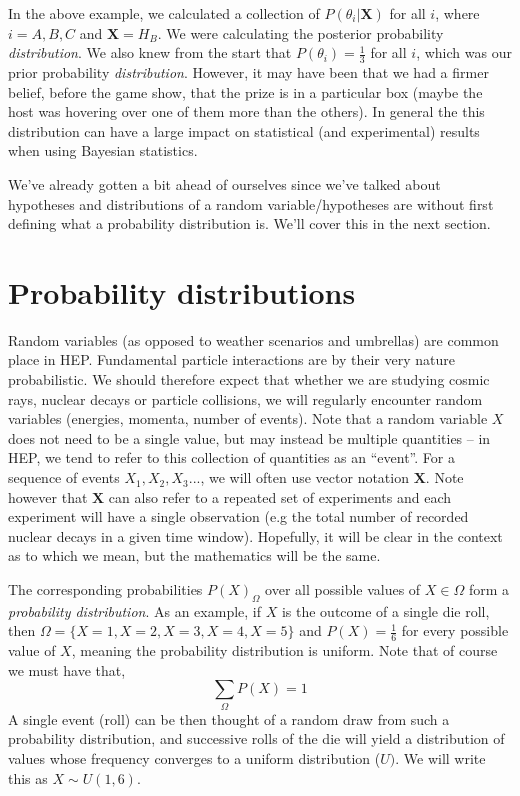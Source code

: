 In the above example, we calculated a collection of $P(\theta_i|\mathbf{X})$ for all $i$, where $i=A, B, C$ and $\mathbf{X}=H_{B}$. We were calculating the posterior probability \emph{distribution}. We also knew from the start that $P(\theta_i)=\frac{1}{3}$ for all $i$, which was  our prior probability \emph{distribution}. However, it may have been that we had a firmer belief, before the game show, that the prize is in a particular box (maybe the host was hovering over one of them more than the others). In general the this distribution can have a large impact on statistical (and experimental) results when using Bayesian statistics. 

We've already gotten a bit ahead of ourselves since we've talked about hypotheses and distributions of a random variable/hypotheses are without first defining what a probability distribution is. We'll cover this in the next section. 

\section{Probability distributions}

Random variables (as opposed to weather scenarios and umbrellas) are common place in HEP. Fundamental particle interactions are by their very nature probabilistic. We should therefore expect that whether we are studying cosmic rays, nuclear decays or particle collisions, we will regularly encounter random variables (energies, momenta, number of events). Note that a random variable $X$ does not need to be a single value, but may instead be multiple quantities -- in HEP, we tend to refer to this collection of quantities as an ``event''. For a sequence of events $X_1, X_2, X_3...$, we will often use vector notation $\mathbf{X}$. Note however that $\mathbf{X}$ can also refer to a repeated set of experiments and each experiment will have a single observation (e.g the total number of recorded nuclear decays in a given time window). Hopefully, it will be clear in the context as to which we mean, but the mathematics will be the same. 

The corresponding probabilities ${P(X)}_{\Omega}$ over all possible values of $X\in\Omega$ form a \emph{probability distribution}. As an example, if $X$ is the outcome of a single die roll, then $\Omega=\{X=1,X=2,X=3,X=4,X=5\}$ and $P(X)=\frac{1}{6}$ for every possible value of $X$, meaning the probability distribution is uniform. Note that of course we must have that,
\begin{equation}
    \sum_{\Omega}P(X)=1 
\end{equation}
A single event (roll) can be then thought of a random draw from such a probability distribution, and successive rolls of the die will yield a distribution of values whose frequency converges to a uniform distribution ($U)$. We will write this as $X\sim U(1,6)$.

